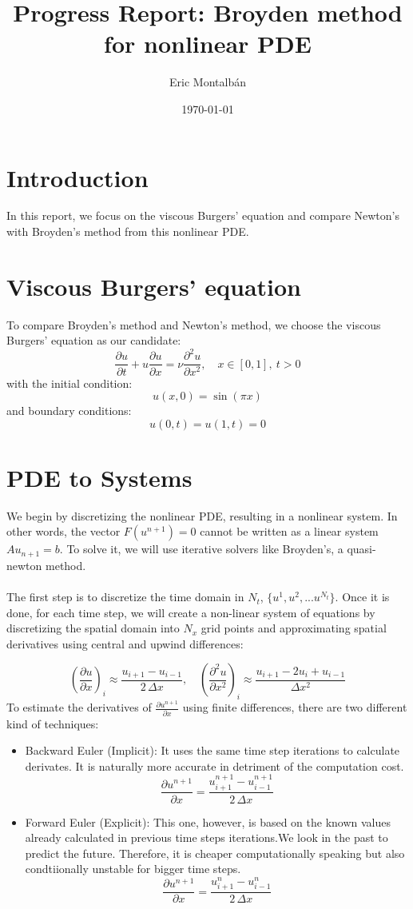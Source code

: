 \documentclass[12pt]{article}
\title{Progress Report: Broyden method for nonlinear PDE}
\author{Eric Montalbán}
\date{\today}
\newcommand{\ddt}[1]{\frac{\partial #1}{\partial t}}
\newcommand{\ddx}[1]{\frac{\partial #1}{\partial x}}
\newcommand{\dfi}[1]{\frac{#1_{i+1} - #1_{i-1}}{2\,\Delta x}}
\begin{document}
\maketitle
\tableofcontents
\newpage

\section{Introduction}
In this report, we focus on the viscous Burgers' equation and compare Newton's with Broyden's method from this nonlinear PDE.
\section{Viscous Burgers' equation}
To compare Broyden’s method and Newton’s method, we choose the viscous Burgers' equation as our candidate:
\begin{equation}
    \ddt{u} + u \ddx{u} = \nu \frac{\partial^2 u}{\partial x^2}, \quad x \in [0,1],\ t > 0
\end{equation}
with the initial condition:
\begin{equation}
    u(x,0) = \sin(\pi x)
\end{equation}
and boundary conditions:
\begin{equation}
    u(0,t) = u(1,t) = 0
\end{equation}

\section{PDE to Systems}
We begin by discretizing the nonlinear PDE, resulting in a nonlinear system. In other words, the vector $F(u^{n+1}) = 0$ cannot be written as a linear system $Au_{n+1}=b$. To solve it, we will use iterative solvers like Broyden’s, a quasi-newton method.
\\
\\
The first step is to discretize the time domain in $N_t$, $\{u^1,u^2, ... u^{N_t} \}$. Once it is done, for each time step, we will create a non-linear system of equations by discretizing the spatial domain into $N_x$ grid points and approximating spatial derivatives using central and upwind differences:

\[
\left( \frac{\partial u}{\partial x} \right)_i \approx \dfi{u}, \quad
\left( \frac{\partial^2 u}{\partial x^2} \right)_i \approx \frac{u_{i+1} - 2u_i + u_{i-1}}{\Delta x^2}
\]
To estimate the derivatives of $\ddx{u^{n+1}}$ using finite differences, there are two different kind of techniques:
\begin{itemize}
    \item Backward Euler (Implicit): It uses the same time step iterations to calculate derivates. It is naturally more accurate in detriment of the computation cost.
    \[
    \ddx{u^{n+1}}= \dfi{u^{n+1}}
    \]
    \item Forward Euler (Explicit): This one, however, is based on the known values already calculated in previous time steps iterations.We look in the past to predict the future. Therefore, it is cheaper computationally speaking but also condtiionally unstable for bigger time steps.
    \[ \ddx{u^{n+1}} = \dfi{u^{n}} 
    \]
\end{itemize}
\end{document}
